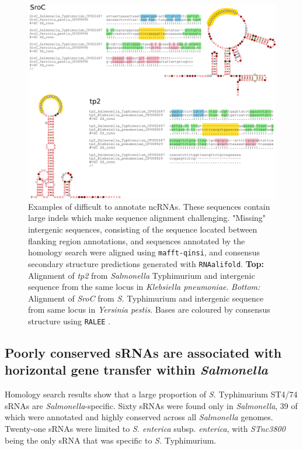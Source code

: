 \begin{figure}[H]
\includegraphics[scale=1.48]{sal/sroc_and_tp2.png}
    \caption[Examples of difficult to annotate ncRNAs]{Examples of difficult to annotate ncRNAs. These sequences contain large indels which make sequence alignment challenging. "Missing" intergenic sequences, consisting of the sequence located between flanking region annotations, and sequences annotated by the homology search were aligned using \texttt{mafft-qinsi}, and consensus secondary structure predictions generated with \texttt{RNAalifold}. \textbf{Top:} Alignment of \textit{tp2} from \textit{Salmonella} Typhimurium and intergenic sequence from the same locus in \textit{Klebsiella pneumoniae}. \textit{Bottom:} Alignment of \textit{SroC} from \textit{S.} Typhimurium and intergenic sequence from same locus in \textit{Yersinia pestis}. Bases are coloured by consensus structure using \texttt{RALEE} \citep{Griffiths2005-jojo}.}
     \label{fig:tp2_sroc_alignment}
\end{figure}

\subsection{Poorly conserved sRNAs are associated with horizontal gene transfer within \textit{Salmonella}}

Homology search results show that a large proportion of \textit{S.} Typhimurium ST4/74 sRNAs are \textit{Salmonella}-specific. Sixty sRNAs were found only in \textit{Salmonella}, 39 of which were annotated and highly conserved across all \textit{Salmonella} genomes. Twenty-one sRNAs were limited to \textit{S. enterica} subsp. \textit{enterica}, with \textit{STnc3800} being the only sRNA that was specific to \textit{S.} Typhimurium. 


